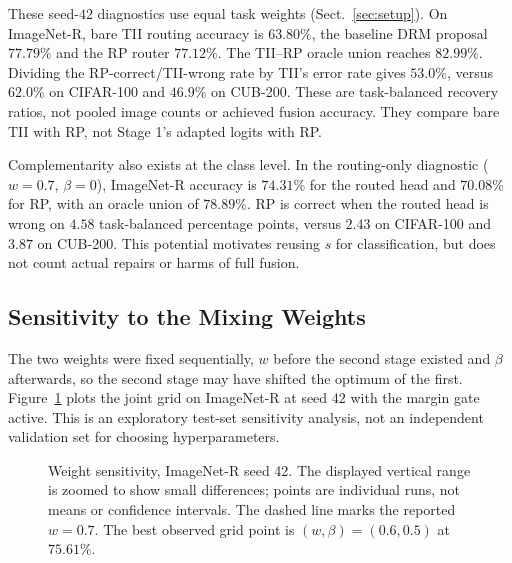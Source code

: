 \documentclass[runningheads]{llncs}
\begin{document}
These seed-$42$ diagnostics use equal task weights (Sect.~\ref{sec:setup}).
On ImageNet-R, bare TII routing accuracy is $63.80\%$, the baseline DRM
proposal $77.79\%$ and the RP router $77.12\%$. The TII--RP oracle union reaches
$82.99\%$. Dividing the RP-correct/TII-wrong rate by TII's error rate gives
$53.0\%$, versus $62.0\%$ on CIFAR-100 and $46.9\%$ on CUB-200.
These are task-balanced recovery ratios, not pooled image counts or achieved
fusion accuracy. They compare bare TII with RP, not Stage 1's adapted logits
with RP.

Complementarity also exists at the class level. In the routing-only diagnostic
($w=0.7$, $\beta=0$), ImageNet-R accuracy is $74.31\%$ for the routed head and
$70.08\%$ for RP, with an oracle union of $78.89\%$. RP is correct when the
routed head is wrong on $4.58$ task-balanced percentage points, versus $2.43$
on CIFAR-100 and $3.87$ on CUB-200. This potential motivates reusing $s$ for
classification, but does not count actual repairs or harms of full fusion.

\subsection{Sensitivity to the Mixing Weights}
\label{sec:weights}

The two weights were fixed sequentially, $w$ before the second stage existed and
$\beta$ afterwards, so the second stage may have shifted the optimum of the
first. Figure~\ref{fig:weights} plots the joint grid on ImageNet-R at seed $42$
with the margin gate active. This is an exploratory test-set sensitivity
analysis, not an independent validation set for choosing hyperparameters.

\begin{figure}[htbp]
\centering
{}
\caption{Weight sensitivity, ImageNet-R seed 42. The displayed vertical range
is zoomed to show small differences; points are individual runs, not means
or confidence intervals. The dashed line marks the reported $w=0.7$.
The best observed grid point is $(w,\beta)=(0.6,0.5)$ at $75.61\%$.}
\label{fig:weights}
\end{figure}
\end{document}
